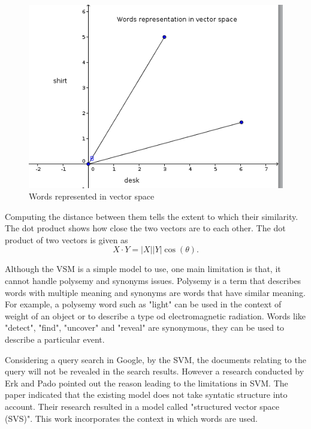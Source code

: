 \begin{figure}[hbtp]
\centering
\includegraphics[scale=1]{words_in_vs.png}
\caption{Words represented in vector space}
\end{figure}
\label{figure 2.1}
Computing the distance between them tells the extent to which their similarity. The dot product shows how close the two vectors are to each other. The dot product of two vectors is given as
$$X\cdot Y=|X||Y|\cos (\theta) \text{.}$$

Although the VSM is a simple model to use, one main limitation is that, it cannot handle polysemy and synonyms issues. Polysemy is a term that describes words with multiple meaning and synonyms are words that have similar meaning.
For example, a polysemy word such as "light" can be used in the context of weight of an object or to describe a type od electromagnetic radiation.
Words like "detect", "find", "uncover" and "reveal" are synonymous, they can be used to describe a particular event.

Considering a query search in Google, by the SVM, the documents relating to the query will not be revealed in the search results. However a research conducted by Erk and Pado pointed out the reason leading to the limitations in SVM.
The paper indicated that the existing model does not take syntatic structure into account. Their research resulted in a model called "structured vector space (SVS)". This work incorporates the context in which words are used.
%

